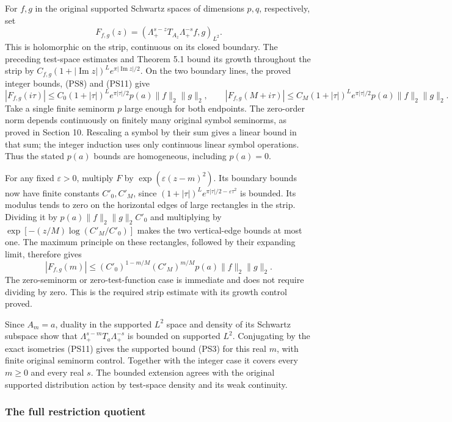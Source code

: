 \documentclass[
  11pt,
]{article}
\begin{document}
For \(f,g\) in the original supported Schwartz spaces of dimensions
\(p,q\), respectively, set \[
 F_{f,g}(z)=
  \left(\Lambda_+^{s-z}T_{A_z}\Lambda_+^{-s}f,g\right)_{L^2}.
 \tag{PS13}
\] This is holomorphic on the strip, continuous on its closed boundary.
The preceding test-space estimates and Theorem 5.1 bound its growth
throughout the strip by \(C_{f,g}(1+|\operatorname{Im}z|)^L
 e^{\pi|\operatorname{Im}z|/2}\). On the two boundary lines, the proved
integer bounds, (PS8) and (PS11) give \[
 |F_{f,g}(i\tau)|
 \le C_0(1+|\tau|)^L e^{\pi|\tau|/2}
        p(a)\|f\|_2\|g\|_2,\qquad
 |F_{f,g}(M+i\tau)|
 \le C_M(1+|\tau|)^L e^{\pi|\tau|/2}
        p(a)\|f\|_2\|g\|_2 .
 \tag{PS14}
\] Take a single finite seminorm \(p\) large enough for both endpoints.
The zero-order norm depends continuously on finitely many original
symbol seminorms, as proved in Section 10. Rescaling a symbol by their
sum gives a linear bound in that sum; the integer induction uses only
continuous linear symbol operations. Thus the stated \(p(a)\) bounds are
homogeneous, including \(p(a)=0\).

For any fixed \(\varepsilon>0\), multiply \(F\) by
\(\exp(\varepsilon(z-m)^2)\). Its boundary bounds now have finite
constants \(C'_0,C'_M\), since
\((1+|\tau|)^L e^{\pi|\tau|/2-\varepsilon\tau^2}\) is bounded. Its
modulus tends to zero on the horizontal edges of large rectangles in the
strip. Dividing it by \(p(a)\|f\|_2\|g\|_2 C'_0\) and multiplying by
\(\exp[-(z/M)\log(C'_M/C'_0)]\) makes the two vertical-edge bounds at
most one. The maximum principle on these rectangles, followed by their
expanding limit, therefore gives \[
 |F_{f,g}(m)|
 \le (C'_0)^{1-m/M}(C'_M)^{m/M}
      p(a)\|f\|_2\|g\|_2 .
 \tag{PS15}
\] The zero-seminorm or zero-test-function case is immediate and does
not require dividing by zero. This is the required strip estimate with
its growth control proved.

Since \(A_m=a\), duality in the supported \(L^2\) space and density of
its Schwartz subspace show that \(\Lambda_+^{s-m}T_a\Lambda_+^{-s}\) is
bounded on supported \(L^2\). Conjugating by the exact isometries (PS11)
gives the supported bound (PS3) for this real \(m\), with finite
original seminorm control. Together with the integer case it covers
every \(m\ge0\) and every real \(s\). The bounded extension agrees with
the original supported distribution action by test-space density and its
weak continuity.

\subsubsection{The full restriction
quotient}\label{the-full-restriction-quotient}
\end{document}
